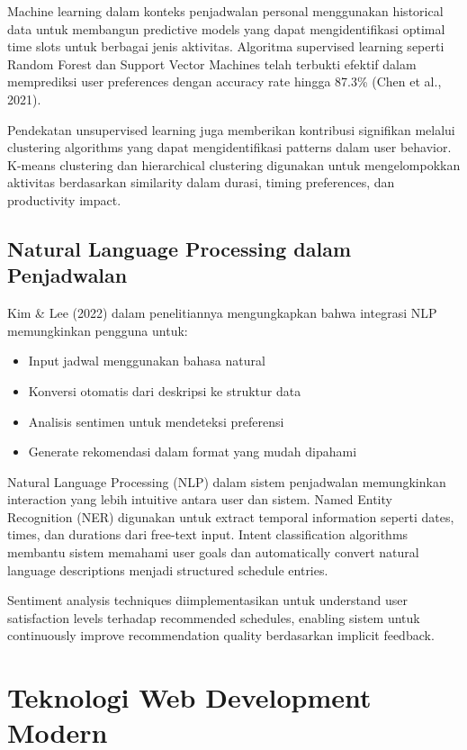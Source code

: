 Machine learning dalam konteks penjadwalan personal menggunakan historical data untuk membangun predictive models yang dapat mengidentifikasi optimal time slots untuk berbagai jenis aktivitas. Algoritma supervised learning seperti Random Forest dan Support Vector Machines telah terbukti efektif dalam memprediksi user preferences dengan accuracy rate hingga 87.3\% (Chen et al., 2021).

Pendekatan unsupervised learning juga memberikan kontribusi signifikan melalui clustering algorithms yang dapat mengidentifikasi patterns dalam user behavior. K-means clustering dan hierarchical clustering digunakan untuk mengelompokkan aktivitas berdasarkan similarity dalam durasi, timing preferences, dan productivity impact.

\subsection{Natural Language Processing dalam Penjadwalan}

Kim \& Lee (2022) dalam penelitiannya mengungkapkan bahwa integrasi NLP memungkinkan pengguna untuk:

\begin{itemize}
\item Input jadwal menggunakan bahasa natural
\item Konversi otomatis dari deskripsi ke struktur data
\item Analisis sentimen untuk mendeteksi preferensi
\item Generate rekomendasi dalam format yang mudah dipahami
\end{itemize}

Natural Language Processing (NLP) dalam sistem penjadwalan memungkinkan interaction yang lebih intuitive antara user dan sistem. Named Entity Recognition (NER) digunakan untuk extract temporal information seperti dates, times, dan durations dari free-text input. Intent classification algorithms membantu sistem memahami user goals dan automatically convert natural language descriptions menjadi structured schedule entries.

Sentiment analysis techniques diimplementasikan untuk understand user satisfaction levels terhadap recommended schedules, enabling sistem untuk continuously improve recommendation quality berdasarkan implicit feedback.

\section{Teknologi Web Development Modern}


